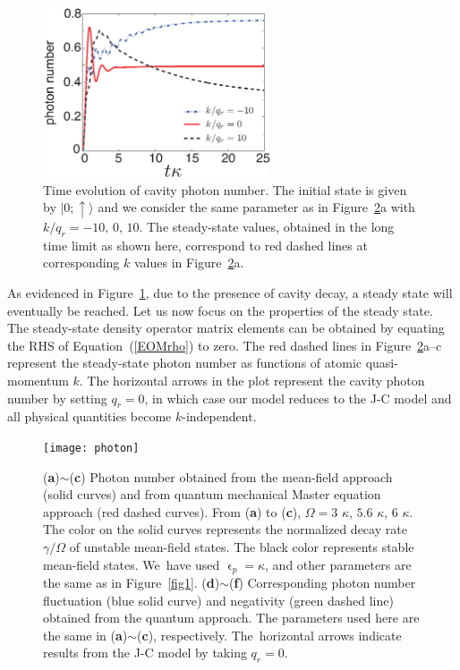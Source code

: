 \documentclass[atoms,article,accept,moreauthors,pdftex,12pt,a4paper]{mdpi}
\begin{document}
\begin{figure}[H]
\centering
\includegraphics[width=0.6\textwidth]{photon_evolution}\vspace{6pt}
\caption{Time evolution of cavity photon number. The initial state is given by $|0;\uparrow\rangle$ and we consider the same parameter as in Figure~\ref{photon}a with $k/q_r=-10,\,0,\,10$. The steady-state values, obtained in the long time limit as shown here, correspond to red dashed lines at corresponding $k$ values in Figure~\ref{photon}a.}\label{evo}
\end{figure}

As evidenced in Figure~\ref{evo}, due to the presence of cavity decay, a steady state will eventually be reached. Let us now focus on the properties of the steady state. The steady-state density operator matrix elements can be obtained by equating the RHS of Equation~(\ref{EOMrho}) to zero. The red dashed lines in Figure~\ref{photon}a--c represent the steady-state photon number as functions of atomic quasi-momentum $k$. The horizontal arrows in the plot represent the cavity photon number by setting $q_r=0$, in which case our model reduces to the J-C model and all physical quantities become $k$-independent.

\begin{figure}[H]
\centering
\texttt{[image: photon]}\vspace{6pt}
\caption{(\textbf{a})$\sim$(\textbf{c}) Photon number obtained from the mean-field approach (solid curves) and from quantum mechanical Master equation approach (red dashed curves). From (\textbf{a}) to (\textbf{c}), $\Omega = 3$ $\kappa$, $5.6$ $\kappa$, $6$ $\kappa$. The color on the solid curves represents the normalized decay rate $\gamma/\Omega$ of unstable mean-field states. The black color represents stable mean-field states. We~have used $\upvarepsilon_p=\kappa$, and other parameters are the same as in Figure~\ref{fig1}. (\textbf{d})$\sim$(\textbf{f}) Corresponding photon number fluctuation (blue solid curve) and negativity (green dashed line) obtained from the quantum approach. The parameters used here are the same in (\textbf{a})$\sim$(\textbf{c}), respectively. The~horizontal arrows indicate results from the J-C model by taking $q_r=0$.
}\label{photon}
\end{figure}
\end{document}
